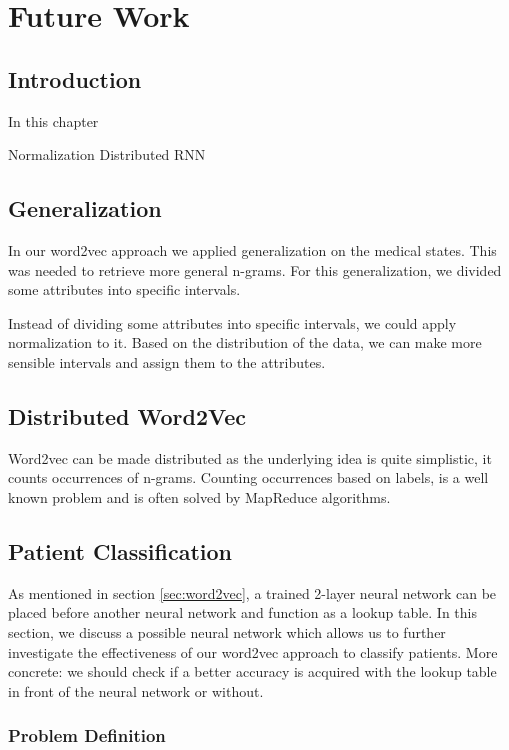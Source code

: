 \graphicspath{ {FutureWork/Images/} }


\chapter{Future Work}
\label{cha:futureWork}

\section{Introduction}
In this chapter 

Normalization
Distributed
RNN


\section{Generalization}

In our word2vec approach we applied generalization on the medical states. This was needed to retrieve more general n-grams. For this generalization, we divided some attributes into specific intervals.

Instead of dividing some attributes into specific intervals, we could apply normalization to it. Based on the distribution of the data, we can make more sensible intervals and assign them to the attributes.


\section{Distributed Word2Vec}

Word2vec can be made distributed as the underlying idea is quite simplistic, it counts occurrences of n-grams. Counting occurrences based on labels, is a well known problem and is often solved by MapReduce algorithms. 


\section{Patient Classification}

As mentioned in section \ref{sec:word2vec}, a trained 2-layer neural network can be placed before another neural network and function as a lookup table. In this section, we discuss a possible neural network which allows us to further investigate the effectiveness of our word2vec approach to classify patients. More concrete: we should check if a better accuracy is acquired with the lookup table in front of the neural network or without. 

\subsection{Problem Definition}

